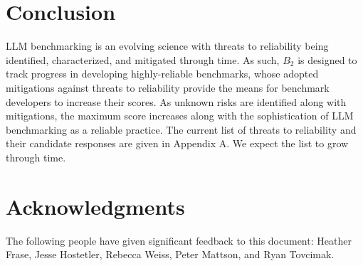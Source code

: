 \documentclass{article}
\newcommand\bb{$B_2$ }
\begin{document}
\section{Conclusion}

LLM benchmarking is an evolving science with threats to reliability being identified, characterized, and mitigated through time. As such, \bb is designed to track progress in developing highly-reliable benchmarks, whose adopted mitigations against threats to reliability provide the means for benchmark developers to increase their scores. As unknown risks are identified along with mitigations, the maximum score increases along with the sophistication of LLM benchmarking as a reliable practice. The current list of threats to reliability and their candidate responses are given in Appendix A. We expect the list to grow through time.
\section{Acknowledgments}
The following people have given significant feedback to this document: Heather Frase, Jesse Hostetler, Rebecca Weiss, Peter Mattson, and Ryan Tovcimak.





\appendix 




\end{document}
